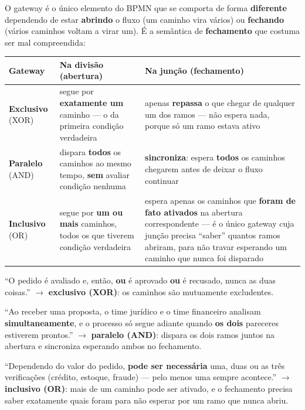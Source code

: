 \begin{conceito}
O gateway é o único elemento do BPMN que se comporta de forma
\textbf{diferente} dependendo de estar \textbf{abrindo} o fluxo (um caminho
vira vários) ou \textbf{fechando} (vários caminhos voltam a virar um). É a
semântica de \textbf{fechamento} que costuma ser mal compreendida:

\begin{center}
\begin{tabular}{@{}p{2.9cm}p{3.9cm}p{4.5cm}@{}}
\toprule
\textbf{Gateway} & \textbf{Na divisão (abertura)} & \textbf{Na junção
(fechamento)} \\
\midrule
\textbf{Exclusivo} (XOR) & segue por \textbf{exatamente um} caminho ---
o da primeira condição verdadeira & apenas \textbf{repassa} o que chegar de
qualquer um dos ramos --- não espera nada, porque só um ramo estava ativo \\
\textbf{Paralelo} (AND) & dispara \textbf{todos} os caminhos ao mesmo
tempo, \textbf{sem} avaliar condição nenhuma & \textbf{sincroniza}: espera
\textbf{todos} os caminhos chegarem antes de deixar o fluxo continuar \\
\textbf{Inclusivo} (OR) & segue por \textbf{um ou mais} caminhos, todos os
que tiverem condição verdadeira & espera apenas os caminhos que
\textbf{foram de fato ativados} na abertura correspondente --- é o único
gateway cuja junção precisa “saber” quantos ramos abriram, para não travar
esperando um caminho que nunca foi disparado \\
\bottomrule
\end{tabular}
\end{center}
\end{conceito}

\begin{exemplo}
“O pedido é avaliado e, então, \textbf{ou} é aprovado \textbf{ou} é
recusado, nunca as duas coisas.” $\to$ \textbf{exclusivo (XOR)}: os
caminhos são mutuamente excludentes.

“Ao receber uma proposta, o time jurídico e o time financeiro analisam
\textbf{simultaneamente}, e o processo só segue adiante quando \textbf{os
dois} pareceres estiverem prontos.” $\to$ \textbf{paralelo (AND)}: dispara
os dois ramos juntos na abertura e sincroniza esperando ambos no
fechamento.

“Dependendo do valor do pedido, \textbf{pode ser necessária} uma, duas ou as
três verificações (crédito, estoque, fraude) --- pelo menos uma sempre
acontece.” $\to$ \textbf{inclusivo (OR)}: mais de um caminho pode ser
ativado, e o fechamento precisa saber exatamente quais foram para não
esperar por um ramo que nunca abriu.
\end{exemplo}

